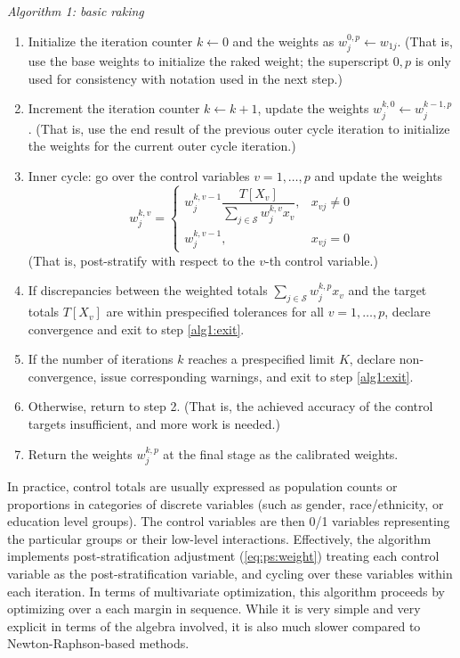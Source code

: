 {\it Algorithm 1: basic raking}
\begin{enumerate}
    \item Initialize the iteration counter $k\leftarrow 0$
          and the weights as $w_j^{0,p} \leftarrow w_{1j}$.
          (That is, use the base weights to initialize the raked weight;
          the superscript $0,p$ is only used for consistency with notation
          used in the next step.)
    \item Increment the iteration counter $k \leftarrow k+1$,
          update the weights $w_j^{k,0} \leftarrow w_j^{k-1,p}$.
          (That is, use the end result of the previous outer cycle iteration
          to initialize the weights for the current outer cycle iteration.)
    \item Inner cycle: go over the control variables $v=1,\ldots,p$ and update the weights
          $$
            w_j^{k,v} =
                \left\{
                \begin{array}{ll}
                    w_j^{k,v-1} \dfrac{ T[X_v] }{ \sum_{j \in \mathcal{S}} w_j^{k,v} x_v },
                        & x_{vj} \neq 0 \\
                    w_j^{k,v-1},
                        & x_{vj} = 0
                \end{array}
                \right.
          $$
          (That is, post-stratify with respect to the $v$-th control variable.)
    \item If discrepancies between the weighted totals $\sum_{j \in \mathcal{S}} w_j^{k,p} x_v$
          and the target totals $T[X_v]$ are within prespecified tolerances for all
          $v=1,\ldots,p$, declare convergence and exit to step \ref{alg1:exit}.
    \item If the number of iterations $k$ reaches a prespecified limit $K$,
          declare non-convergence, issue corresponding warnings, and exit to step \ref{alg1:exit}.
    \item Otherwise, return to step 2. (That is, the achieved accuracy of the control targets
          insufficient, and more work is needed.)
    \item Return the weights $w_j^{k,p}$ at the final stage as the calibrated weights.
            \label{alg1:exit}
\end{enumerate}


In practice, control totals are usually expressed as population counts
or proportions in categories of discrete variables (such as gender,
race/ethnicity, or education level groups).
The control variables are then 0/1 variables representing the particular groups
or their low-level interactions.
Effectively, the algorithm implements post-stratification adjustment
(\ref{eq:ps:weight}) treating each control variable as the post-stratification
variable, and cycling over these variables within each iteration.
In terms of multivariate optimization,
this algorithm proceeds by optimizing over a each margin in sequence.
While it is very simple and very explicit in terms
of the algebra involved, it is also much slower compared
to Newton-Raphson-based methods.

